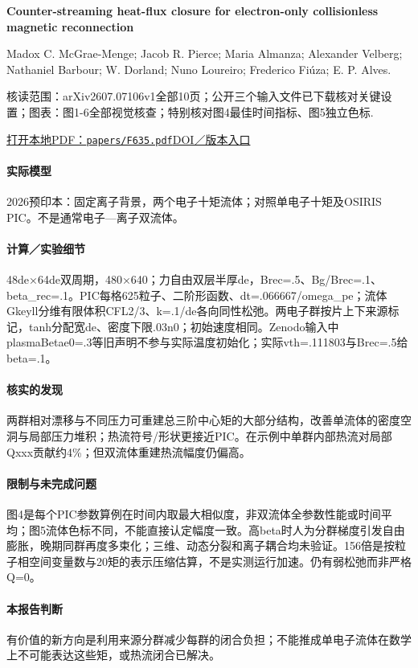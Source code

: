 \textbf{Counter-streaming heat-flux closure for electron-only collisionless magnetic reconnection}\citep{F635}\

Madox C. McGrae-Menge;  Jacob R. Pierce;  Maria Almanza;  Alexander Velberg;  Nathaniel Barbour;  W. Dorland;  Nuno Loureiro;  Frederico Fiúza;  E. P. Alves.

\textsf{核读范围：}arXiv2607.07106v1全部10页；公开三个输入文件已下载核对关键设置；\textsf{图表：}图1-6全部视觉核查；特别核对图4最佳时间指标、图5独立色标.

\href{run:papers/F635.pdf}{打开本地PDF：\texttt{papers/F635.pdf}}\quad\href{https://doi.org/10.48550/arxiv.2607.07106}{DOI／版本入口}

\paragraph{实际模型}2026预印本：固定离子背景，两个电子十矩流体；对照单电子十矩及OSIRIS PIC。不是通常电子—离子双流体。

\paragraph{计算／实验细节}48de×64de双周期，480×640；力自由双层半厚de，Brec=.5、Bg/Brec=.1、beta\_rec=.1。PIC每格625粒子、二阶形函数、dt=.066667/omega\_pe；流体Gkeyll分维有限体积CFL2/3、k=.1/de各向同性松弛。两电子群按片上下来源标记，tanh分配宽de、密度下限.03n0；初始速度相同。Zenodo输入中plasmaBetae0=.3等旧声明不参与实际温度初始化；实际vth=.111803与Brec=.5给beta=.1。

\paragraph{核实的发现}两群相对漂移与不同压力可重建总三阶中心矩的大部分结构，改善单流体的密度空洞与局部压力堆积；热流符号/形状更接近PIC。在示例中单群内部热流对局部Qxxx贡献约4\%；但双流体重建热流幅度仍偏高。

\paragraph{限制与未完成问题}图4是每个PIC参数算例在时间内取最大相似度，非双流体全参数性能或时间平均；图5流体色标不同，不能直接认定幅度一致。高beta时人为分群梯度引发自由膨胀，晚期同群再度多束化；三维、动态分裂和离子耦合均未验证。156倍是按粒子相空间变量数与20矩的表示压缩估算，不是实测运行加速。仍有弱松弛而非严格Q=0。

\paragraph{本报告判断}有价值的新方向是利用来源分群减少每群的闭合负担；不能推成单电子流体在数学上不可能表达这些矩，或热流闭合已解决。

